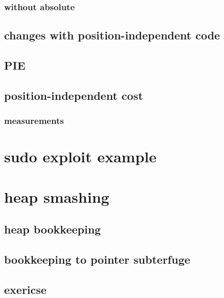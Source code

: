 \subsubsection{without absolute}


\subsection{changes with position-independent code}


\subsection{PIE}


\subsection{position-independent cost}


\subsubsection{measurements}


\section{sudo exploit example}



\section{heap smashing}


\subsection{heap bookkeeping}


\subsection{bookkeeping to pointer subterfuge}


\subsection{exericse}



